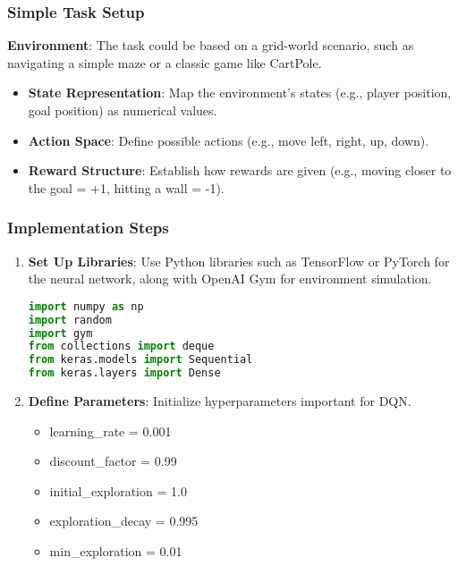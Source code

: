 \documentclass{beamer}
\begin{document}
\begin{frame}
    \frametitle{Simple Task Setup}
    \textbf{Environment}: The task could be based on a grid-world scenario, such as navigating a simple maze or a classic game like CartPole.
    
    \begin{itemize}
        \item \textbf{State Representation}: Map the environment's states (e.g., player position, goal position) as numerical values.
        \item \textbf{Action Space}: Define possible actions (e.g., move left, right, up, down).
        \item \textbf{Reward Structure}: Establish how rewards are given (e.g., moving closer to the goal = +1, hitting a wall = -1).
    \end{itemize}
\end{frame}

\begin{frame}[fragile]
    \frametitle{Implementation Steps}
    \begin{enumerate}
        \item \textbf{Set Up Libraries}: Use Python libraries such as TensorFlow or PyTorch for the neural network, along with OpenAI Gym for environment simulation.
        
        \begin{lstlisting}[language=Python]
import numpy as np
import random
import gym
from collections import deque
from keras.models import Sequential
from keras.layers import Dense
        \end{lstlisting}

        \item \textbf{Define Parameters}: Initialize hyperparameters important for DQN.
        \begin{itemize}
            \item learning\_rate = 0.001
            \item discount\_factor = 0.99
            \item initial\_exploration = 1.0
            \item exploration\_decay = 0.995
            \item min\_exploration = 0.01
        \end{itemize}
    \end{enumerate}
\end{frame}
\end{document}
